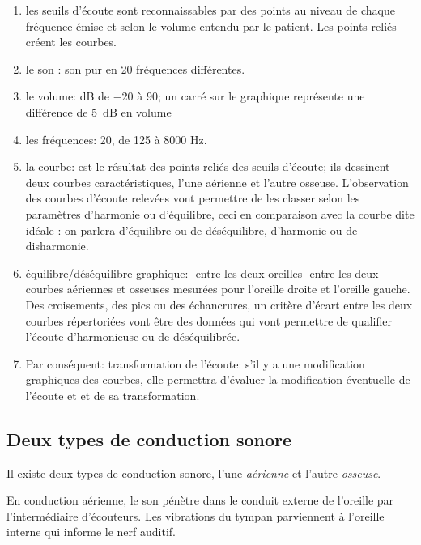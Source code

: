   \begin{enumerate}
 	\item les seuils d'écoute sont reconnaissables par des points au niveau de 
          chaque fréquence émise et selon le volume entendu par le patient. Les points reliés créent les courbes.
 	\item le son : son pur en 20 fréquences différentes.  
 	\item le volume: dB de $-20$ à 90; un carré sur le graphique représente une différence de \SI{5}{\dB} en
 		volume 
 	\item les fréquences: 20, de 125 à 8000 Hz. 
 	\item la courbe: est le résultat des points reliés des seuils
          d'écoute; ils 
          dessinent deux courbes caractéristiques, l'une aérienne et l'autre osseuse.
          L'observation des courbes d'écoute relevées vont permettre
          de les classer selon les paramètres d'harmonie ou
          d'équilibre, ceci 
 	en comparaison avec la courbe dite idéale : on parlera
        d'équilibre ou de
 	déséquilibre, d'harmonie ou de disharmonie.
        
      \item équilibre/déséquilibre graphique:
        -entre les deux oreilles
        -entre les deux courbes aériennes et osseuses mesurées pour
        l'oreille droite et l'oreille gauche.
        Des croisements, des pics ou des échancrures, un critère
        d'écart
        entre les deux courbes répertoriées vont être des
        données qui vont permettre de
        qualifier l'écoute d'harmonieuse ou de
        déséquilibrée. 
        
 	\item Par conséquent:  transformation de l'écoute: s'il y a une modification
          graphiques des courbes, elle 
          permettra d'évaluer la modification éventuelle de l'écoute et
          et de sa transformation.
          
\end{enumerate}
 
 

\subsection{Deux types de conduction sonore}
Il existe deux types de conduction sonore, l'une \emph{aérienne} et l'autre \emph{osseuse}.

En conduction aérienne, le son pénètre dans le conduit externe de
l'oreille par l'intermédiaire d'écouteurs. Les vibrations du tympan
parviennent à l'oreille interne qui informe le nerf auditif.

